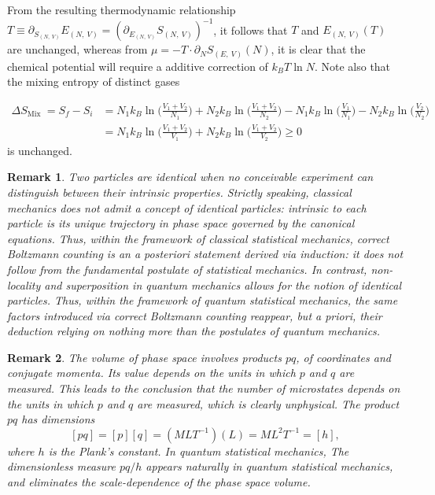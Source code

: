 \documentclass[11pt]{article}
\newtheorem*{remark}{Remark}
\begin{document}
From the resulting thermodynamic relationship \(T \equiv \partial_{S_{(N,~V)}} E_{(N,~V)} = (\partial_{E_{(N,~V)}} S_{(N,~V)})^{-1}\), it follows that \(T\) and \(E_{(N,~V)} (T)\) are unchanged, whereas from \(\mu = - T \cdot \partial_{N} S_{(E,~V)}(N)\), it is clear that the chemical potential will require a additive correction of \(k_{B} T \ln N\). Note also that the mixing entropy of distinct gases

\begin{align*}
\Delta S_{\text {Mix }}=S_{f}-S_{i} & =N_{1} k_{B} \ln \bigg(\frac{V_{1} + V_{2}}{N_{1}} \bigg) + N_{2} k_{B} \ln \bigg(\frac{V_{1} + V_{2}}{N_{2}}\bigg) - N_{1} k_{B} \ln \bigg(\frac{V_{1}}{N_{1}}\bigg) - N_{2} k_{B} \ln \bigg(\frac{V_{2}}{N_{2}} \bigg) \\
& =N_{1} k_{B} \ln \bigg(\frac{V_{1} + V_{2}}{V_{1}}\bigg) + N_{2} k_{B} \ln \bigg(\frac{V_{1} + V_{2}}{V_{2}}\bigg) \geq 0
\end{align*}
is unchanged.
\begin{remark}
Two particles are identical when no conceivable experiment can distinguish between their intrinsic properties. Strictly speaking, classical mechanics does not admit a concept of identical particles: \emph{intrinsic} to each particle is its unique trajectory in phase space governed by the canonical equations. Thus, within the framework of classical statistical mechanics, correct Boltzmann counting is an \emph{a posteriori} statement derived via induction: it does not follow from the fundamental postulate of statistical mechanics. In contrast, \emph{non-locality} and \emph{superposition} in quantum mechanics allows for the notion of identical particles. Thus, within the framework of quantum statistical mechanics, the same factors introduced via \emph{correct Boltzmann counting} reappear, but \emph{a priori}, their deduction relying on nothing more than the postulates of quantum mechanics.
\label{orgf1b6c0c}
\end{remark}
\begin{remark}
The volume of phase space involves products \(pq\), of coordinates and conjugate momenta. Its value depends on the units in which \(p\) and \(q\) are measured. This leads to the conclusion that the number of microstates depends on the units in which \(p\) and \(q\) are measured, which is clearly unphysical. The product \(pq\) has dimensions
\[
[pq] = [p][q] = (MLT^{-1})(L) = ML^2T^{-1} = [h],
\]
where \(h\) is the Plank's constant. In quantum statistical mechanics, The dimensionless measure \(pq/h\) appears naturally in quantum statistical mechanics, and eliminates the scale-dependence of the phase space volume.
\label{orgf629321}
\end{remark}
\end{document}
